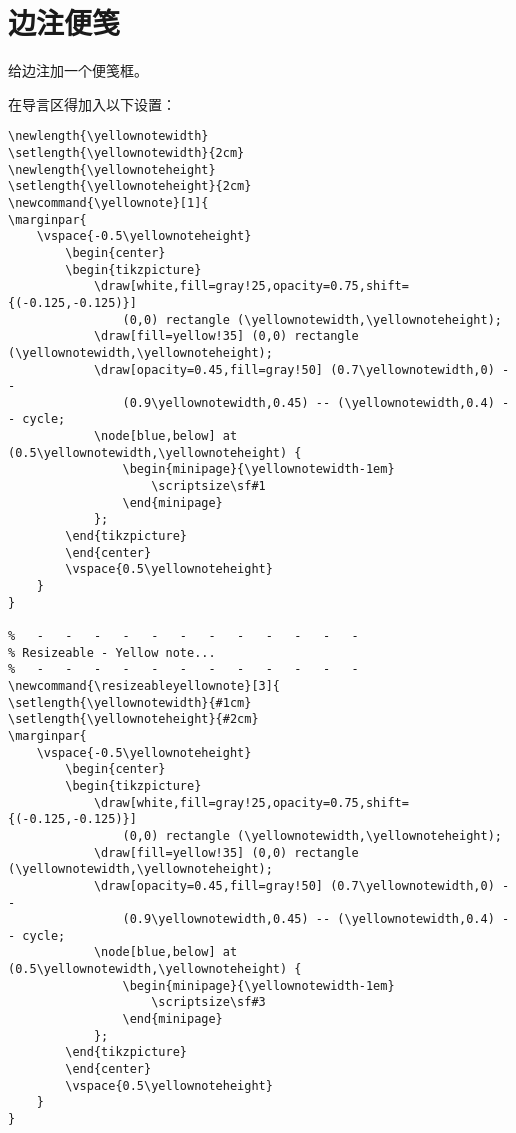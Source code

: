 \section{边注便笺}
给边注加一个便笺框。
\begin{cmd}[label=使用方法]
\end{cmd}
在导言区得加入以下设置：
\footnotesize
\begin{lstlisting}
\newlength{\yellownotewidth}
\setlength{\yellownotewidth}{2cm}
\newlength{\yellownoteheight}
\setlength{\yellownoteheight}{2cm}
\newcommand{\yellownote}[1]{
\marginpar{
    \vspace{-0.5\yellownoteheight}
        \begin{center}
        \begin{tikzpicture}
            \draw[white,fill=gray!25,opacity=0.75,shift={(-0.125,-0.125)}]
                (0,0) rectangle (\yellownotewidth,\yellownoteheight);
            \draw[fill=yellow!35] (0,0) rectangle (\yellownotewidth,\yellownoteheight);
            \draw[opacity=0.45,fill=gray!50] (0.7\yellownotewidth,0) --
                (0.9\yellownotewidth,0.45) -- (\yellownotewidth,0.4) -- cycle;
            \node[blue,below] at (0.5\yellownotewidth,\yellownoteheight) {
                \begin{minipage}{\yellownotewidth-1em}
                    \scriptsize\sf#1
                \end{minipage}
            };
        \end{tikzpicture}
        \end{center}
        \vspace{0.5\yellownoteheight}
    }
}

%   -   -   -   -   -   -   -   -   -   -   -   -
% Resizeable - Yellow note...
%   -   -   -   -   -   -   -   -   -   -   -   -
\newcommand{\resizeableyellownote}[3]{
\setlength{\yellownotewidth}{#1cm}
\setlength{\yellownoteheight}{#2cm}
\marginpar{
    \vspace{-0.5\yellownoteheight}
        \begin{center}
        \begin{tikzpicture}
            \draw[white,fill=gray!25,opacity=0.75,shift={(-0.125,-0.125)}]
                (0,0) rectangle (\yellownotewidth,\yellownoteheight);
            \draw[fill=yellow!35] (0,0) rectangle (\yellownotewidth,\yellownoteheight);
            \draw[opacity=0.45,fill=gray!50] (0.7\yellownotewidth,0) --
                (0.9\yellownotewidth,0.45) -- (\yellownotewidth,0.4) -- cycle;
            \node[blue,below] at (0.5\yellownotewidth,\yellownoteheight) {
                \begin{minipage}{\yellownotewidth-1em}
                    \scriptsize\sf#3
                \end{minipage}
            };
        \end{tikzpicture}
        \end{center}
        \vspace{0.5\yellownoteheight}
    }
}
\end{lstlisting}
\normalsize

